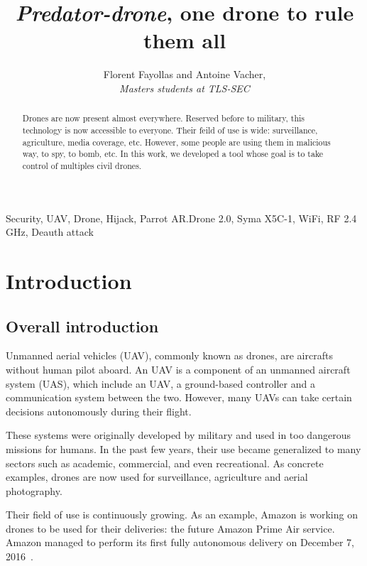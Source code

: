 \documentclass[conference,a4paper]{IEEEtran}
\begin{document}
\title{%
  \textit{Predator-drone}, one drone to rule them all%
}
\author{%
  Florent Fayollas and Antoine Vacher,\\%
  \textit{Masters students at TLS-SEC}%
}
\maketitle


\begin{abstract}
  Drones are now present almost everywhere. Reserved before to military, this technology
  is now accessible to everyone. Their feild of use is wide: surveillance, agriculture,
  media coverage, etc. However, some people are using them in malicious way, to spy,
  to bomb, etc. In this work, we developed a tool whose goal is to take control of
  multiples civil drones.
\end{abstract}
\vspace*{1.5em}

\begin{IEEEkeywords}
  Security, UAV, Drone, Hijack, Parrot AR.Drone 2.0, Syma X5C-1, WiFi, RF 2.4 GHz, Deauth attack
\end{IEEEkeywords}
\vspace*{1.5em}



\section{Introduction}
\subsection{Overall introduction}
Unmanned aerial vehicles (UAV), commonly known as drones, are aircrafts without human
pilot aboard. An UAV is a component of an unmanned aircraft system (UAS), which include an
UAV, a ground-based controller and a communication system between the two. However, many
UAVs can take certain decisions autonomously during their flight.

These systems were originally developed by military and used in too dangerous missions for
humans. In the past few years, their use became generalized to many sectors such as
academic, commercial, and even recreational. As concrete examples, drones are now used for
surveillance, agriculture and aerial photography.

Their field of use is continuously growing. As an example, Amazon is working on drones to
be used for their deliveries: the future Amazon Prime Air service. Amazon managed to
perform its first fully autonomous delivery on December 7, 2016~\cite{bib:amazon}.
\end{document}
